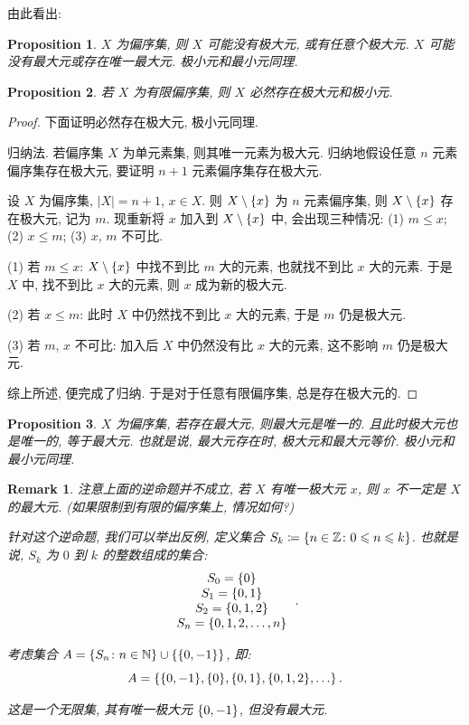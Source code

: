 \documentclass[UTF8]{ctexart}
\theoremstyle{mystyle}
\newtheorem{proposition}{Proposition}[section]
\theoremstyle{myremark}
\newtheorem*{remark}{Remark}
\theoremstyle{plain}
\newcommand{\Z}{\mathbb Z}
\newcommand{\N}{\mathbb N}
\DeclarePairedDelimiter\set{\{}{\}}
\begin{document}
由此看出:

\begin{proposition}
    $ X $ 为偏序集, 则 $ X $ 可能没有极大元, 或有任意个极大元. $ X $ 可能没有最大元或存在唯一最大元. 极小元和最小元同理.
\end{proposition}

\begin{proposition}
    若 $ X $ 为有限偏序集, 则 $ X $ 必然存在极大元和极小元.
\end{proposition}

\begin{proof}
    下面证明必然存在极大元, 极小元同理.

    归纳法. 若偏序集 $ X $ 为单元素集, 则其唯一元素为极大元. 归纳地假设任意 $ n $ 元素偏序集存在极大元, 要证明 $ n + 1 $ 元素偏序集存在极大元.

    设 $ X $ 为偏序集, $ |X| = n + 1 $, $ x \in X $. 则 $ X \setminus \set{x} $ 为 $ n $ 元素偏序集, 则 $ X \setminus \set{x} $ 存在极大元, 记为 $ m $. 现重新将 $ x $ 加入到 $ X \setminus \set{x} $ 中, 会出现三种情况: (1) $ m \le x $; (2) $ x \le m $; (3) $ x $, $ m $ 不可比.

    (1) 若 $ m \le x $: $ X \setminus \set{x} $ 中找不到比 $ m $ 大的元素, 也就找不到比 $ x $ 大的元素. 于是 $ X $ 中, 找不到比 $ x $ 大的元素, 则 $ x $ 成为新的极大元.

    (2) 若 $ x \le m $: 此时 $ X $ 中仍然找不到比 $ x $ 大的元素, 于是 $ m $ 仍是极大元.

    (3) 若 $ m $, $ x $ 不可比: 加入后 $ X $ 中仍然没有比 $ x $ 大的元素, 这不影响 $ m $ 仍是极大元.

    综上所述, 便完成了归纳. 于是对于任意有限偏序集, 总是存在极大元的.
\end{proof}

\begin{proposition}
    $ X $ 为偏序集, 若存在最大元, 则最大元是唯一的. 且此时极大元也是唯一的, 等于最大元. 也就是说, 最大元存在时, 极大元和最大元等价. 极小元和最小元同理.
\end{proposition}

\begin{remark}
    注意上面的逆命题并不成立, 若 $ X $ 有唯一极大元 $ x $, 则 $ x $ 不一定是 $ X $ 的最大元. (如果限制到有限的偏序集上, 情况如何?)

    针对这个逆命题, 我们可以举出反例, 定义集合 $ S_k \coloneqq \set{n \in \Z \colon 0 \leqslant n \leqslant k} $. 也就是说, $ S_k $ 为 $ 0 $ 到 $ k $ 的整数组成的集合:
    \[ \begin{array}{c}
        S_0 = \set{0} \\
        S_1 = \set{0, 1} \\
        S_2 = \set{0, 1, 2} \\
        S_n = \set{0, 1, 2, \dots, n}
    \end{array} \,.\]

    考虑集合 $ A = \set{S_n \colon n \in \N} \cup \set{\set{0, -1}} $, 即:
    \[ A = \set{\set{0, -1}, \set{0}, \set{0, 1}, \set{0, 1, 2}, \dots} \,.\]

    这是一个无限集, 其有唯一极大元 $ \set{0, -1} $, 但没有最大元.
\end{remark}
\end{document}
